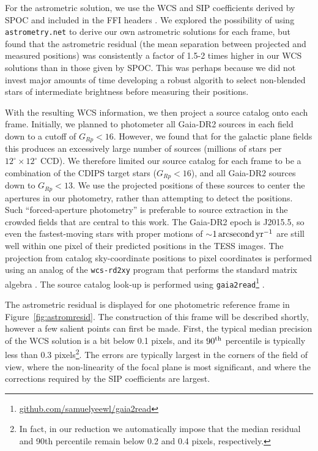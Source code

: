 \documentclass[12pt,twocolumn,tighten]{aastex62}
\begin{document}
For the astrometric solution, we use the WCS and SIP coefficients
derived by SPOC and included in the FFI headers
\citep[][Sec.~8]{pence_fits_2010}.  We explored the possibility of
using \texttt{astrometry.net} \citep{lang_2010} to derive our own
astrometric solutions for each frame, but found that the astrometric
residual (the mean separation between projected and measured
positions) was consistently a factor of 1.5-2 times higher in our WCS
solutions than in those given by SPOC.  This was perhaps because
we did not invest major amounts of time developing a robust
algorith to select non-blended stars of intermediate brightness before
measuring their positions.

With the resulting WCS information, we then project a source catalog
onto each frame.  Initially, we planned to photometer all Gaia-DR2
sources in each field down to a cutoff of $G_{Rp} < 16$.  However, we
found that for the galactic plane fields this produces an excessively
large number of sources (millions of stars per
$12^\circ\times12^\circ$ CCD).  We therefore limited our source
catalog for each frame to be
a combination of the CDIPS target stars ($G_{Rp} < 16$), and
all Gaia-DR2 sources down to $G_{Rp} < 13$.  We use the
projected positions of these sources to center the apertures in our
photometry,
rather than attempting to detect the positions.  Such
``forced-aperture photometry'' is preferable to source
extraction in the crowded fields that are central to this work.  The
Gaia-DR2 epoch is J2015.5, so even the fastest-moving stars with
proper motions of $\sim$$1\,{\rm arcsecond}\,{\rm yr}^{-1}$ are still
well within one pixel of their predicted positions in the TESS images.
The projection from catalog sky-coordinate positions to pixel
coordinates is performed using an analog of the \texttt{wcs-rd2xy}
program that performs the standard matrix algebra \citep{lang_2010}.
The source catalog look-up is performed using
\texttt{gaia2read}\footnote{\url{github.com/samuelyeewl/gaia2read}}
\citep{kim_2018_gaia2read}.

The astrometric residual is displayed for one photometric reference
frame in Figure~\ref{fig:astromresid}.
The construction of this frame will be described shortly, however
a few salient points can first be made.
First, the typical median precision of the WCS solution is a bit below
0.1 pixels, and its $90^{\rm th}$ percentile is typically less than
0.3 pixels\footnote{In fact, in our reduction we automatically impose
that the median residual and 90th percentile remain below 0.2 and 0.4
pixels, respectively.}.
The errors are typically largest in the corners of the field of view,
where the non-linearity of the focal plane is most significant, and
where the corrections required by the SIP coefficients are largest.
\end{document}

